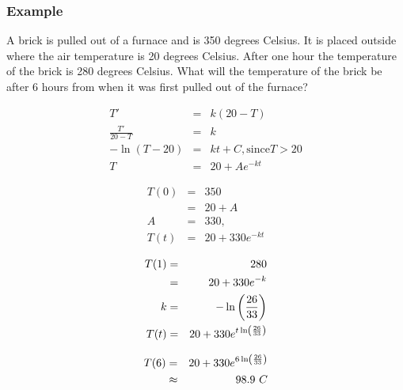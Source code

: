 \begin{frame}
  \frametitle{Example}

  {\color{red}A brick is pulled out of a furnace and is 350 degrees Celsius.} 
  {\color{blue}It is placed outside where the air temperature is 20 degrees Celsius.} 
  {\color{purple}After one hour the temperature of the brick is 280
    degrees Celsius.}  
  What will the temperature of the brick be after 6 hours from when it
  was first pulled out of the furnace?


\end{frame}


\begin{frame}

  \begin{eqnarray*}
    T' & = & k (20-T) \\
    \frac{T'}{20-T} & = & k \\
    -\ln(T-20) & = & kt + C,  \text{since} T > 20\\
    T & = & 20 + A e^{-kt}
  \end{eqnarray*}

  \begin{eqnarray*}
    T(0) & = & 350 \\
    & = & 20 + A \\
    A & = & 330, \\
    T(t) & = & 20 + 330 e^{-kt}
  \end{eqnarray*}

\end{frame}


\begin{frame}

  \begin{eqnarray*}
    T(1) & = & 280 \\
    & = & 20 + 330 e^{-k} \\
    k & = & -\ln\left(\frac{26}{33}\right) \\
    T(t) & = & 20 + 330 e^{t\ln\left(\frac{26}{33}\right)}
  \end{eqnarray*}

  \begin{eqnarray*}
    T(6) & = & 20 + 330 e^{6\ln\left(\frac{26}{33}\right)} \\
    & \approx & 98.9 ~C
  \end{eqnarray*}

\end{frame}


